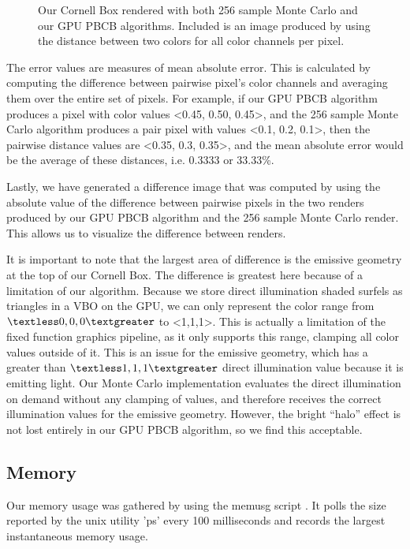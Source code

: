 \begin{figure}
   \captionfonts
   \caption[256 sample Monte Carlo vs. GPU PBCB]{Our Cornell Box rendered with both 256 sample Monte Carlo and our GPU PBCB algorithms. Included is an image produced by using the distance between two colors for all color channels per pixel.}
   \label{fig:mc_gpu_pbcb_compare}
\end{figure}

The error values are measures of mean absolute error. This is calculated by computing the difference between pairwise pixel's color channels and averaging them over the entire set of pixels. For example, if our GPU PBCB algorithm produces a pixel with color values \textless0.45, 0.50, 0.45\textgreater, and the 256 sample Monte Carlo algorithm produces a pair pixel with values \textless0.1, 0.2, 0.1\textgreater, then the pairwise distance values are \textless0.35, 0.3, 0.35\textgreater, and the mean absolute error would be the average of these distances, i.e. 0.3333 or 33.33\%.

Lastly, we have generated a difference image that was computed by using the absolute value of the difference between pairwise pixels in the two renders produced by our GPU PBCB algorithm and the 256 sample Monte Carlo render. This allows us to visualize the difference between renders.

It is important to note that the largest area of difference is the emissive geometry at the top of our Cornell Box. The difference is greatest here because of a limitation of our algorithm. Because we store direct illumination shaded surfels as triangles in a VBO on the GPU, we can only represent the color range from $\textless0,0,0\textgreater$ to \textless1,1,1\textgreater. This is actually a limitation of the fixed function graphics pipeline, as it only supports this range, clamping all color values outside of it. This is an issue for the emissive geometry, which has a greater than $\textless1,1,1\textgreater$ direct illumination value because it is emitting light. Our Monte Carlo implementation evaluates the direct illumination on demand without any clamping of values, and therefore receives the correct illumination values for the emissive geometry. However, the bright “halo” effect is not lost entirely in our GPU PBCB algorithm, so we find this acceptable.

\subsection{Memory}
Our memory usage was gathered by using the memusg script \cite{bib:memusg}. It polls the size reported by the unix utility 'ps' every 100 milliseconds and records the largest instantaneous memory usage.

